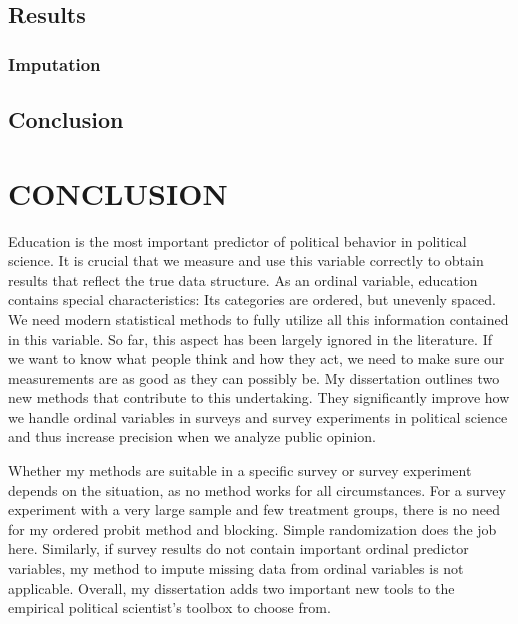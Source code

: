 \documentclass[12pt,econ]{sources/authesis}
\begin{document}
\hypertarget{framing-results}{%
\section{Results}\label{framing-results}}

\hypertarget{framing-results-imputation}{%
\subsection{Imputation}\label{framing-results-imputation}}

\hypertarget{framing-conclusion}{%
\section{Conclusion}\label{framing-conclusion}}

\hypertarget{conclusion}{%
\chapter{CONCLUSION}\label{conclusion}}

Education is the most important predictor of political behavior in political science. It is crucial that we measure and use this variable correctly to obtain results that reflect the true data structure. As an ordinal variable, education contains special characteristics: Its categories are ordered, but unevenly spaced. We need modern statistical methods to fully utilize all this information contained in this variable. So far, this aspect has been largely ignored in the literature. If we want to know what people think and how they act, we need to make sure our measurements are as good as they can possibly be. My dissertation outlines two new methods that contribute to this undertaking. They significantly improve how we handle ordinal variables in surveys and survey experiments in political science and thus increase precision when we analyze public opinion.

Whether my methods are suitable in a specific survey or survey experiment depends on the situation, as no method works for all circumstances. For a survey experiment with a very large sample and few treatment groups, there is no need for my ordered probit method and blocking. Simple randomization does the job here. Similarly, if survey results do not contain important ordinal predictor variables, my method to impute missing data from ordinal variables is not applicable. Overall, my dissertation adds two important new tools to the empirical political scientist's toolbox to choose from.
\end{document}
